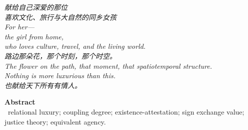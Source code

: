 \documentclass[11pt,a4paper]{article}
\begin{document}
\thispagestyle{empty}
\vspace*{4.5cm}
\begin{center}
\begin{minipage}{0.72\linewidth}
\centering\itshape\color{rose}
{\cjk 献给自己深爱的那位}\\[0.4em]
{\cjk 喜欢文化、旅行与大自然的同乡女孩}\\[0.8em]
For her---\\[0.3em]
the girl from home,\\[0.2em]
who loves culture, travel, and the living world.\\[1.0em]
{\cjk 路边那朵花，那个时刻，那个时空。}\\[0.3em]
\textit{The flower on the path, that moment, that spatiotemporal structure.}\\[0.3em]
\textit{Nothing is more luxurious than this.}\\[1.0em]
{\upshape\footnotesize\color{gold} {\cjk 也献给天下所有有情人。}}
\end{minipage}
\end{center}
\newpage

\thispagestyle{empty}
\noindent\textbf{\large\color{rosedeep} Abstract}\\[0.6em]


\vspace{1.2em}
\, \textcolor{inksoft}{relational luxury; coupling degree; existence-attestation; sign exchange value; justice theory; equivalent agency.}
\newpage

\tableofcontents
\newpage















\printbibliography[heading=bibintoc]
\end{document}
